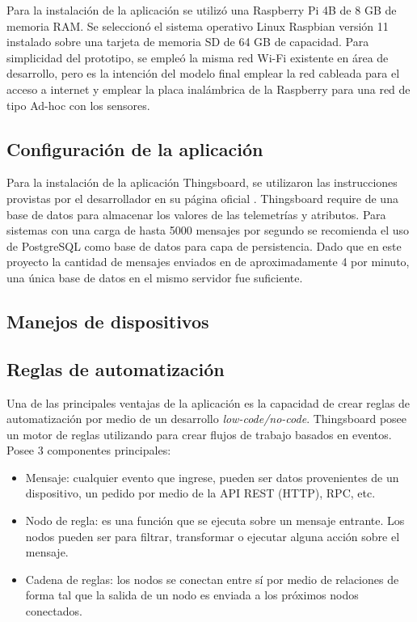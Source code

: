 Para la instalación de la aplicación se utilizó una Raspberry Pi 4B de 8 GB de memoria RAM. 
Se seleccionó el sistema operativo Linux Raspbian versión 11 instalado sobre una tarjeta de memoria SD de 64 GB de capacidad.
Para simplicidad del prototipo, se empleó la misma red Wi-Fi existente en área de desarrollo, pero es la intención del modelo final emplear la red cableada para el acceso a internet y emplear la placa inalámbrica de la Raspberry para una red de tipo Ad-hoc con los sensores.



\subsection{Configuración de la aplicación}
\label{sec:Configuración de la aplicación}

Para la instalación de la aplicación Thingsboard, se utilizaron las instrucciones provistas por el desarrollador en su página oficial \citep{tb_install}.
Thingsboard require de una base de datos para almacenar los valores de las telemetrías y atributos. Para sistemas con una carga de hasta 5000 mensajes por segundo se recomienda el uso de PostgreSQL como base de datos para capa de persistencia. Dado que en este proyecto la cantidad de mensajes enviados en de aproximadamente 4 por minuto, una única base de datos en el mismo servidor fue suficiente.

\subsection{Manejos de dispositivos}
\label{sec:Manejos de dispositivos}


\subsection{Reglas de automatización}
\label{sec:Reglas de automatización}
 Una de las principales ventajas de la aplicación es la capacidad de crear reglas de automatización por medio de un desarrollo \textit{low-code/no-code}\citep{lcnc}. Thingsboard posee un motor de reglas utilizando para crear flujos de trabajo basados en eventos. Posee 3 componentes principales:
 \begin{itemize}
 \item Mensaje: cualquier evento que ingrese, pueden ser datos provenientes de un dispositivo, un pedido por medio de la API REST (HTTP), RPC, etc.
 \item Nodo de regla: es una función que se ejecuta sobre un mensaje entrante. Los nodos pueden ser para filtrar, transformar o ejecutar alguna acción sobre el mensaje.
 \item Cadena de reglas: los nodos se conectan entre sí por medio de relaciones de forma tal que la salida de un nodo es enviada a los próximos nodos conectados.
 \end{itemize}

